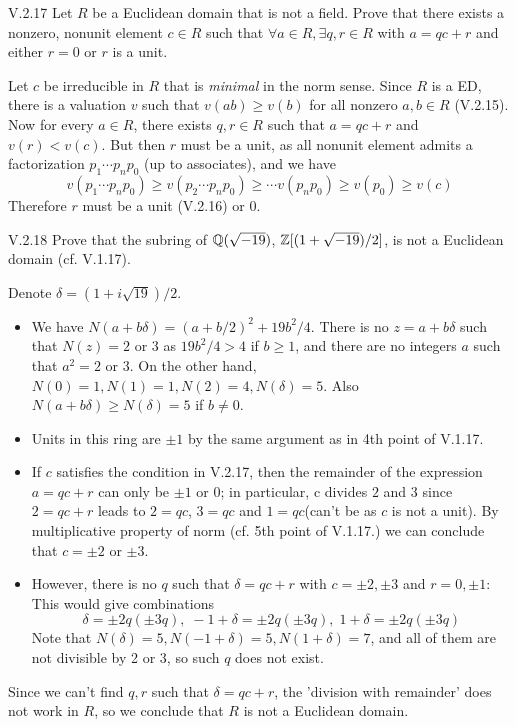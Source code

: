 \begin{problem}{V.2.17}
Let $R$ be a Euclidean domain that is not a field. Prove that there exists a nonzero, nonunit element $c \in R$ such that $\forall a \in R, \exists q,r \in R$ with $a = qc+r$ and either $r = 0$ or $r$ is a unit.
\end{problem}
\begin{pf}
Let $c$ be irreducible in $R$ that is \emph{minimal} in the norm sense. Since $R$ is a ED, there is a valuation $v$ such that $v(ab) \geq v(b)$ for all nonzero $a,b \in R$ (V.2.15). Now for every $a \in R$, there exists $q,r \in R$ such that $a = qc+r$ and $v(r) < v(c)$. But then $r$ must be a unit, as all nonunit element admits a factorization $p_1\cdots p_np_0$ (up to associates), and we have
\[
v(p_1\cdots p_np_0) \geq v(p_2\cdots p_np_0) \geq \cdots v(p_np_0) \geq v(p_0) \geq v(c)
\]
Therefore $r$ must be a unit (V.2.16) or $0$.
\end{pf}

\begin{problem}{V.2.18}
Prove that the subring of $\mathbb{Q}(\sqrt{-19})$, $\mathbb{Z}[(1+\sqrt{-19})/2]$, is not a Euclidean domain (cf. V.1.17).
\end{problem}
\begin{pf}
Denote $\delta = (1+i\sqrt{19})/2$.
\begin{itemize}
	\setlength\itemsep{0pt}
	\item We have $N(a+b\delta) = (a+b/2)^2 + 19b^2/4$. There is no $z = a+b\delta$ such that $N(z) = 2$ or $3$ as $19b^2/4 > 4$ if $b \geq 1$, and there are no integers $a$ such that $a^2 = 2$ or $3$. On the other hand, $N(0) = 1, N(1) = 1, N(2) = 4, N(\delta) = 5$. Also $N(a+b\delta) \geq N(\delta) = 5$ if $b \neq 0$.
	\item Units in this ring are $\pm 1$ by the same argument as in 4th point of V.1.17.
	\item If $c$ satisfies the condition in V.2.17, then the remainder of the expression $a = qc + r$ can only be $\pm 1$ or $0$; in particular, c divides $2$ and $3$ since $2 = qc + r$ leads to $2 = qc$, $3 = qc$ and $1 = qc$(can't be as $c$ is not a unit). By multiplicative property of norm (cf. 5th point of V.1.17.) we can conclude that $c = \pm 2$ or $\pm 3$.
	\item However, there is no $q$ such that $\delta = qc + r$ with $c = \pm 2, \pm 3$ and $r = 0, \pm 1$: This would give combinations
	\[
	\delta = \pm 2q(\pm 3q), \; -1+\delta = \pm 2q(\pm 3q), \; 1+\delta = \pm 2q(\pm 3q)
	\]
	Note that $N(\delta) = 5, N(-1+\delta) = 5, N(1+\delta) = 7$, and all of them are not divisible by 2 or 3, so such $q$ does not exist.
\end{itemize}
Since we can't find $q,r$ such that $\delta = qc+r$, the 'division with remainder' does not work in $R$, so we conclude that $R$ is not a Euclidean domain.
\end{pf}

